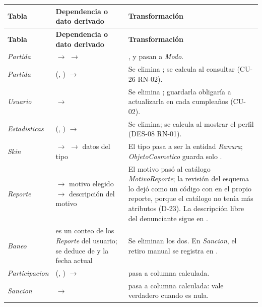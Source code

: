 \begin{center}\small
\begin{longtable}{|L{0.18\textwidth}|L{0.34\textwidth}|L{0.38\textwidth}|}
\hline
\textbf{Tabla} & \textbf{Dependencia o dato derivado} & \textbf{Transformación} \\ \hline
\endfirsthead
\hline
\textbf{Tabla} & \textbf{Dependencia o dato derivado} & \textbf{Transformación} \\ \hline
\endhead
\textit{Partida} &  $\rightarrow$  $\rightarrow$  & ,  y  pasan a \textit{Modo}. \\ \hline
\textit{Partida} & (, ) $\rightarrow$  & Se elimina ; se calcula al consultar (\mbox{CU-26} \mbox{RN-02}). \\ \hline
\textit{Usuario} &  $\rightarrow$  & Se elimina ; guardarla obligaría a actualizarla en cada cumpleaños (\mbox{CU-02}). \\ \hline
\textit{Estadisticas} & (, ) $\rightarrow$  & Se elimina; se calcula al mostrar el perfil (\mbox{DES-08} \mbox{RN-01}). \\ \hline
\textit{Skin} &  $\rightarrow$  $\rightarrow$ datos del tipo & El tipo pasa a ser la entidad \textit{Ranura}; \textit{ObjetoCosmetico} guarda solo . \\ \hline
\textit{Reporte} &  $\rightarrow$ motivo elegido $\rightarrow$ descripción del motivo & El motivo pasó al catálogo \textit{MotivoReporte}; la revisión del esquema lo dejó como un código con  en el propio reporte, porque el catálogo no tenía más atributos (\mbox{D-23}). La descripción libre del denunciante sigue en . \\ \hline
\textit{Baneo} &  es un conteo de los \textit{Reporte} del usuario;  se deduce de  y la fecha actual & Se eliminan los dos. En \textit{Sancion}, el retiro manual se registra en . \\ \hline
\textit{Participacion} & (, ) $\rightarrow$  &  pasa a columna calculada. \\ \hline
\textit{Sancion} &  $\rightarrow$  &  pasa a columna calculada: vale verdadero cuando  es nula. \\ \hline

\end{longtable}
\end{center}
